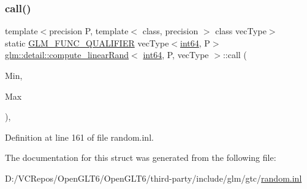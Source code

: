 \subsubsection{\texorpdfstring{call()}{call()}}
{\footnotesize\ttfamily template$<$precision P, template$<$ class, precision $>$ class vec\+Type$>$ \\
static \mbox{\hyperlink{setup_8hpp_a33fdea6f91c5f834105f7415e2a64407}{G\+L\+M\+\_\+\+F\+U\+N\+C\+\_\+\+Q\+U\+A\+L\+I\+F\+I\+ER}} vec\+Type$<$\mbox{\hyperlink{namespaceglm_1_1detail_a5b1c3227ec636c24a0676746381adfc8}{int64}}, P$>$ \mbox{\hyperlink{structglm_1_1detail_1_1compute__linear_rand}{glm\+::detail\+::compute\+\_\+linear\+Rand}}$<$ \mbox{\hyperlink{namespaceglm_1_1detail_a5b1c3227ec636c24a0676746381adfc8}{int64}}, P, vec\+Type $>$\+::call (\begin{DoxyParamCaption}\item[{vec\+Type$<$ \mbox{\hyperlink{namespaceglm_1_1detail_a5b1c3227ec636c24a0676746381adfc8}{int64}}, P $>$ const \&}]{Min,  }\item[{vec\+Type$<$ \mbox{\hyperlink{namespaceglm_1_1detail_a5b1c3227ec636c24a0676746381adfc8}{int64}}, P $>$ const \&}]{Max }\end{DoxyParamCaption})\hspace{0.3cm}{\ttfamily [inline]}, {\ttfamily [static]}}



Definition at line 161 of file random.\+inl.



The documentation for this struct was generated from the following file\+:\begin{DoxyCompactItemize}
\item 
D\+:/\+V\+C\+Repos/\+Open\+G\+L\+T6/\+Open\+G\+L\+T6/third-\/party/include/glm/gtc/\mbox{\hyperlink{random_8inl}{random.\+inl}}\end{DoxyCompactItemize}
